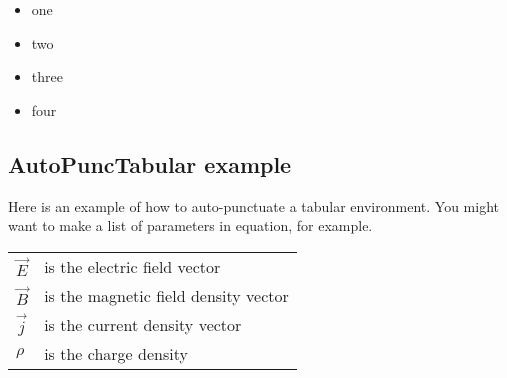 \documentclass[11pt,parskip=half]{scrartcl}
\begin{document}
\begin{LTXexample}
\disableAPprotectnest
\begin{AutoPuncItems}
\begin{itemize}
    \item one
    \item two
    \item three
    \item four
\end{itemize}
\end{AutoPuncItems}
\end{LTXexample}

\subsection{AutoPuncTabular example}
Here  is an example of how to auto-punctuate a tabular environment.
You might want to make a list of parameters in equation, for example.
\begin{LTXexample}
\begin{AutoPuncTabular}
    \begin{tabular}{ll}
    $\vec E$ & is the electric field vector\\
    $\vec B$ & is the magnetic field density vector\\
    $\vec j$ & is the current density vector\\
    $\rho$ & is the charge density\\
    \end{tabular}
\end{AutoPuncTabular}
\end{LTXexample}
\end{document}
